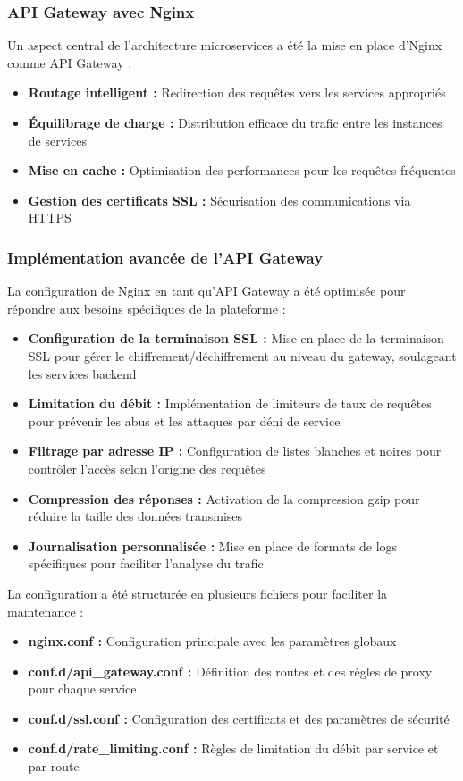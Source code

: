 \subsubsection{API Gateway avec Nginx}

Un aspect central de l'architecture microservices a été la mise en place d'Nginx comme API Gateway :

\begin{itemize}
  \item \textbf{Routage intelligent :} Redirection des requêtes vers les services appropriés
  \item \textbf{Équilibrage de charge :} Distribution efficace du trafic entre les instances de services
  \item \textbf{Mise en cache :} Optimisation des performances pour les requêtes fréquentes
  \item \textbf{Gestion des certificats SSL :} Sécurisation des communications via HTTPS
\end{itemize}

\subsubsection{Implémentation avancée de l'API Gateway}

La configuration de Nginx en tant qu'API Gateway a été optimisée pour répondre aux besoins spécifiques de la plateforme :

\begin{itemize}
  \item \textbf{Configuration de la terminaison SSL :} Mise en place de la terminaison SSL pour gérer le chiffrement/déchiffrement au niveau du gateway, soulageant les services backend
  \item \textbf{Limitation du débit :} Implémentation de limiteurs de taux de requêtes pour prévenir les abus et les attaques par déni de service
  \item \textbf{Filtrage par adresse IP :} Configuration de listes blanches et noires pour contrôler l'accès selon l'origine des requêtes
  \item \textbf{Compression des réponses :} Activation de la compression gzip pour réduire la taille des données transmises
  \item \textbf{Journalisation personnalisée :} Mise en place de formats de logs spécifiques pour faciliter l'analyse du trafic
\end{itemize}

La configuration a été structurée en plusieurs fichiers pour faciliter la maintenance :
\begin{itemize}
  \item \textbf{nginx.conf :} Configuration principale avec les paramètres globaux
  \item \textbf{conf.d/api\_gateway.conf :} Définition des routes et des règles de proxy pour chaque service
  \item \textbf{conf.d/ssl.conf :} Configuration des certificats et des paramètres de sécurité
  \item \textbf{conf.d/rate\_limiting.conf :} Règles de limitation du débit par service et par route
\end{itemize}

